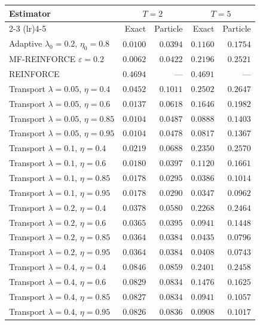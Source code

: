 \begin{table}[H]
\centering
\begin{tabular}{lrrrr}
\toprule
Estimator & \multicolumn{2}{c}{$T=2$} & \multicolumn{2}{c}{$T=5$} \\
\cmidrule(lr){2-3} \cmidrule(lr){4-5}
 & Exact & Particle & Exact & Particle \\
\midrule
Adaptive $\lambda_0=0.2$, $\eta_0=0.8$ & $0.0100$ & $0.0394$ & $0.1160$ & $0.1754$ \\
MF-REINFORCE $\varepsilon=0.2$ & $0.0062$ & $0.0422$ & $0.2196$ & $0.2521$ \\
REINFORCE & $0.4694$ & --- & $0.4691$ & --- \\
Transport $\lambda=0.05$, $\eta=0.4$ & $0.0452$ & $0.1011$ & $0.2502$ & $0.2647$ \\
Transport $\lambda=0.05$, $\eta=0.6$ & $0.0137$ & $0.0618$ & $0.1646$ & $0.1982$ \\
Transport $\lambda=0.05$, $\eta=0.85$ & $0.0104$ & $0.0487$ & $0.0888$ & $0.1403$ \\
Transport $\lambda=0.05$, $\eta=0.95$ & $0.0104$ & $0.0478$ & $0.0817$ & $0.1367$ \\
Transport $\lambda=0.1$, $\eta=0.4$ & $0.0219$ & $0.0688$ & $0.2350$ & $0.2570$ \\
Transport $\lambda=0.1$, $\eta=0.6$ & $0.0180$ & $0.0397$ & $0.1120$ & $0.1661$ \\
Transport $\lambda=0.1$, $\eta=0.85$ & $0.0178$ & $0.0295$ & $0.0386$ & $0.1014$ \\
Transport $\lambda=0.1$, $\eta=0.95$ & $0.0178$ & $0.0290$ & $0.0347$ & $0.0962$ \\
Transport $\lambda=0.2$, $\eta=0.4$ & $0.0378$ & $0.0580$ & $0.2268$ & $0.2464$ \\
Transport $\lambda=0.2$, $\eta=0.6$ & $0.0365$ & $0.0395$ & $0.0941$ & $0.1448$ \\
Transport $\lambda=0.2$, $\eta=0.85$ & $0.0364$ & $0.0384$ & $0.0435$ & $0.0796$ \\
Transport $\lambda=0.2$, $\eta=0.95$ & $0.0364$ & $0.0384$ & $0.0408$ & $0.0743$ \\
Transport $\lambda=0.4$, $\eta=0.4$ & $0.0846$ & $0.0859$ & $0.2401$ & $0.2458$ \\
Transport $\lambda=0.4$, $\eta=0.6$ & $0.0829$ & $0.0834$ & $0.1476$ & $0.1625$ \\
Transport $\lambda=0.4$, $\eta=0.85$ & $0.0827$ & $0.0834$ & $0.0941$ & $0.1057$ \\
Transport $\lambda=0.4$, $\eta=0.95$ & $0.0826$ & $0.0836$ & $0.0908$ & $0.1017$ \\

\end{tabular}
\end{table}
